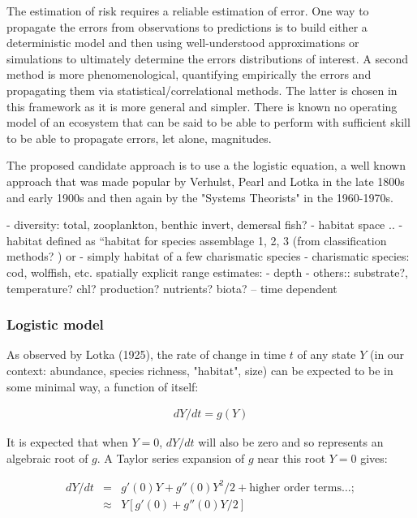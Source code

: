 \documentclass[letterpaper,portrait,11pt]{scrartcl}
\numberwithin{equation}{section}		%
\numberwithin{figure}{section}			%
\numberwithin{table}{section}				%
\begin{document}
The estimation of risk requires a reliable estimation of error. One way to propagate the errors from observations to predictions is to build either a deterministic model and then using well-understood approximations or simulations to ultimately determine the errors distributions of interest. A second method is more phenomenological, quantifying empirically the errors and propagating them via statistical/correlational methods. The latter is chosen in this framework as it is more general and simpler. There is known no operating model of an ecosystem that can be said to be able to perform with sufficient skill to be able to propagate errors, let alone, magnitudes. 

The proposed candidate approach is to use a the logistic equation, a well known approach that was made popular by Verhulst, Pearl and Lotka in the late 1800s and early 1900s and then again by the "Systems Theorists" in the 1960-1970s.  

- diversity: total, zooplankton, benthic invert, demersal fish?
- habitat space ..
- habitat defined as {``}habitat for species assemblage 1, 2, 3 (from classification methods? ) or
- simply habitat of a few charismatic species
- charismatic species: cod, wolffish, etc.
	spatially explicit range estimates:
- depth
- others:: substrate?, temperature? chl? production? nutrients? biota? -- time dependent


\subsubsection{Logistic model}

As observed by Lotka (1925), the rate of change in time $t$ of any state $Y$ (in our context: abundance, species richness, "habitat", size) can be expected to be in some minimal way, a function of itself:  

\begin{eqnarray} 
\label{eqLogisticContinuous}
dY / dt = g(Y)
\end{eqnarray}

It is expected that when $Y = 0$, $dY/dt$ will also be zero and so represents an algebraic root of $g$. A Taylor series expansion of $g$ near this root $Y=0$ gives:

\begin{eqnarray*} 
  \label{eqLogisticTaylorSeries}
  dY / dt &=&  g'(0) Y + g''(0) Y^{2}/2  + \text{higher order terms} \dots; \\
  &\approx& Y [g'(0) + g''(0) Y/2  ]
\end{eqnarray*}
\end{document}

